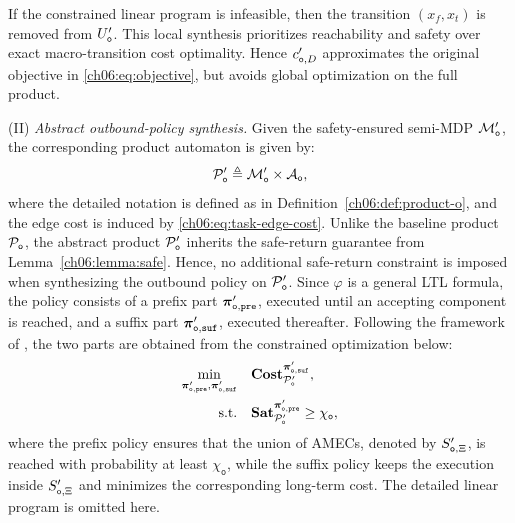  If the constrained linear program
is infeasible, then the transition \((x_f,x_t)\) is removed from
\(U'_{\textup{\texttt{o}}}\).
This local synthesis prioritizes reachability and safety over exact
macro-transition cost optimality. Hence
\(c'_{\textup{\texttt{o}},D}\) approximates the original objective in
\eqref{ch06:eq:objective}, but avoids global optimization on the full product.

(II) \emph{Abstract outbound-policy synthesis.}
Given the safety-ensured semi-MDP
\(\mathcal{M}'_{\textup{\texttt{o}}}\), the corresponding product automaton is
given by:
\begin{equation}
\label{ch06:eq:abstract-task-product}
\mathcal{P}'_{\textup{\texttt{o}}} \triangleq
\mathcal{M}'_{\textup{\texttt{o}}}
\times
\mathcal{A}_{\textup{\texttt{o}}},
\end{equation}
where the detailed notation is defined as in
Definition~\ref{ch06:def:product-o}, and the edge cost is induced by
\eqref{ch06:eq:task-edge-cost}.
Unlike the baseline product
\(\mathcal{P}_{\textup{\texttt{o}}}\), the abstract product
\(\mathcal{P}'_{\textup{\texttt{o}}}\) inherits the safe-return guarantee from
Lemma~\ref{ch06:lemma:safe}. Hence, no additional safe-return constraint is
imposed when synthesizing the outbound policy on
\(\mathcal{P}'_{\textup{\texttt{o}}}\). Since \(\varphi\) is a general LTL
formula, the policy consists of a prefix part
\(\boldsymbol{\pi}'_{\textup{\texttt{o}},\texttt{pre}}\), executed until an
accepting component is reached, and a suffix part
\(\boldsymbol{\pi}'_{\textup{\texttt{o}},\texttt{suf}}\), executed
thereafter. Following the framework of \citet{guo2018probabilistic}, the two
parts are obtained from the constrained optimization below:
\begin{subequations}
\label{ch06:eq:abstract-prod-task-lp}
\begin{align}
\min_{
\boldsymbol{\pi}'_{\textup{\texttt{o}},\texttt{pre}},
\boldsymbol{\pi}'_{\textup{\texttt{o}},\texttt{suf}}
}
\quad
&\textbf{Cost}_{\mathcal{P}'_{\textup{\texttt{o}}}}^{
\boldsymbol{\pi}'_{\textup{\texttt{o}},\texttt{suf}}},
\label{ch06:eq:abstract-prod-task-lp-objective} \\
\text{s.t.}\quad
&\textbf{Sat}_{\mathcal{P}'_{\textup{\texttt{o}}}}^{
\boldsymbol{\pi}'_{\textup{\texttt{o}},\texttt{pre}}}
\geq \chi_{\texttt{o}},
\label{ch06:eq:abstract-prod-task-lp-condition}
\end{align}
\end{subequations}
where the prefix policy ensures that the union of AMECs, denoted by
\(S'_{\textup{\texttt{o}},\Xi}\), is reached with probability at least
\(\chi_{\texttt{o}}\), while the suffix policy keeps the execution inside
\(S'_{\textup{\texttt{o}},\Xi}\) and minimizes the corresponding long-term
cost. The detailed linear program is omitted here.


